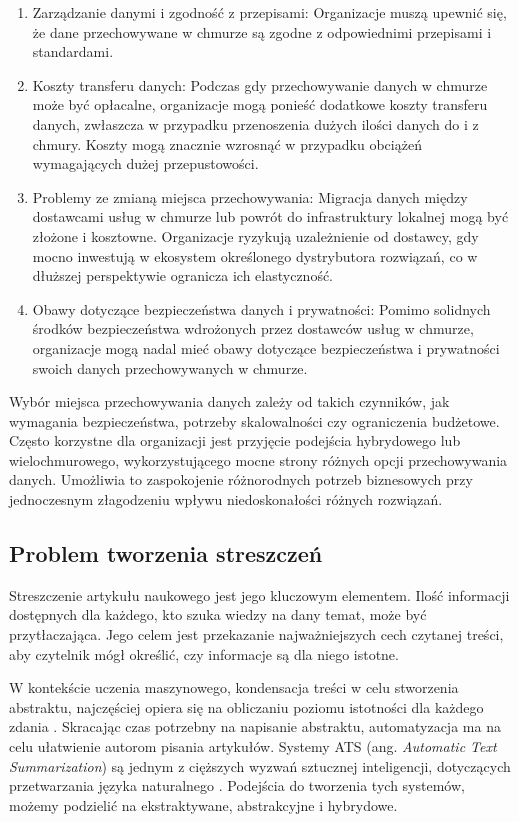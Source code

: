\documentclass[12pt,a4paper,twoside]{article}
\begin{document}
\begin{itemize}
\begin{enumerate}
			\item Zarządzanie danymi i zgodność z przepisami: Organizacje muszą upewnić się, że dane przechowywane w chmurze są zgodne z odpowiednimi przepisami i standardami.
			\item Koszty transferu danych: Podczas gdy przechowywanie danych w chmurze może być opłacalne, organizacje mogą ponieść dodatkowe koszty transferu danych, zwłaszcza w przypadku przenoszenia dużych ilości danych do i z chmury. Koszty mogą znacznie wzrosnąć w przypadku obciążeń wymagających dużej przepustowości.
			\item Problemy ze zmianą miejsca przechowywania: Migracja danych między dostawcami usług w chmurze lub powrót do infrastruktury lokalnej mogą być złożone i kosztowne. Organizacje ryzykują uzależnienie od dostawcy, gdy mocno inwestują w ekosystem określonego dystrybutora rozwiązań, co w dłuższej perspektywie ogranicza ich elastyczność.
			\item Obawy dotyczące bezpieczeństwa danych i prywatności: Pomimo solidnych środków bezpieczeństwa wdrożonych przez dostawców usług w chmurze, organizacje mogą nadal mieć obawy dotyczące bezpieczeństwa i prywatności swoich danych przechowywanych w chmurze.
		\end{enumerate}
\end{itemize}\par
Wybór miejsca przechowywania danych zależy od takich czynników, jak wymagania bezpieczeństwa, potrzeby skalowalności czy ograniczenia budżetowe. Często korzystne dla organizacji jest przyjęcie podejścia hybrydowego lub wielochmurowego, wykorzystującego mocne strony różnych opcji przechowywania danych. Umożliwia to zaspokojenie różnorodnych potrzeb biznesowych przy jednoczesnym złagodzeniu wpływu niedoskonałości różnych rozwiązań.
\subsection{Problem tworzenia streszczeń}
Streszczenie artykułu naukowego jest jego kluczowym elementem. Ilość informacji dostępnych dla każdego, kto szuka wiedzy na dany temat, może być przytłaczająca. Jego celem jest przekazanie najważniejszych cech czytanej treści, aby czytelnik mógł określić, czy informacje są dla niego istotne. \par
W kontekście uczenia maszynowego, kondensacja treści w celu stworzenia abstraktu, najczęściej opiera się na obliczaniu poziomu istotności dla każdego zdania \cite{MUTLU2020102359}. Skracając czas potrzebny na napisanie abstraktu, automatyzacja ma na celu ułatwienie autorom pisania artykułów. Systemy ATS (ang. \textit{Automatic Text Summarization}) są jednym z cięższych wyzwań sztucznej inteligencji, dotyczących przetwarzania języka naturalnego \cite{ELKASSAS2021113679}. Podejścia do tworzenia tych systemów, możemy podzielić na ekstraktywane, abstrakcyjne i hybrydowe. 
\end{document}
